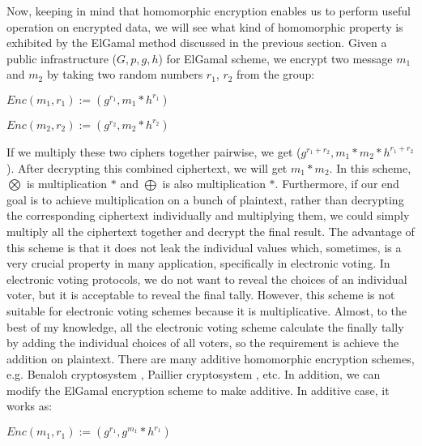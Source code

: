 	    
	    
	    
	     
	    Now, keeping in mind that homomorphic encryption enables us to perform useful operation on encrypted data, 
	    we will see what kind of homomorphic property is exhibited by the ElGamal method discussed in the previous section. 
	    Given a public infrastructure ($G, p, g, h$) for ElGamal scheme, 
	     we encrypt two message $m_{1}$ and $m_{2}$ by taking two random numbers $r_{1}$,  $r_{2}$ from the group:
	     \begin{displayquote}
	     $Enc(m_{1}, r_{1}) := (g^{r_{1}}, m_{1} *  h^{r_{1}})$ 
	      \end{displayquote}
	     
	     \begin{displayquote}
	     $Enc(m_{2}, r_{2}) := (g^{r_{2}}, m_{2} *  h^{r_{2}})$ 
	      \end{displayquote}
	     
	     
	     If we multiply these two ciphers together pairwise, we get ($g^{r_{1}+ r_{2}}, m_{1} * m_{2} *  h^{r_{1} + r_{2}}$). 
	     After decrypting this combined ciphertext, we will get $m_{1} * m_{2}$. In this scheme, $\bigotimes$ is multiplication $*$ and 
	     $\bigoplus$ is also multiplication $*$.  Furthermore,  
	     if our end goal is  to achieve multiplication on a bunch of plaintext,  rather than decrypting the corresponding ciphertext individually 
	     and multiplying them, we could simply multiply all the ciphertext together and decrypt the final result.  
	     The advantage of this scheme is that it does not leak the individual values which, sometimes, is a very crucial property in many 
	     application, specifically in electronic voting.
	     In electronic voting protocols, we do not want to reveal the choices of an individual voter, but it is acceptable to reveal the final tally. 
	     However, this scheme is not suitable for electronic voting schemes because it is multiplicative. Almost, to the best of 
	     my knowledge, all the electronic voting scheme calculate the finally tally by adding the individual choices of all
	     voters, so the requirement is achieve the addition on plaintext. 
	     There are 
	     many additive homomorphic encryption schemes, e.g. Benaloh cryptosystem \citep{benaloh1994dense}, Paillier cryptosystem \citep{paillier1999public},  etc. In addition, we 
	     can modify the ElGamal encryption scheme to make additive. In additive case, it works as:
	       \begin{displayquote}
	      $Enc(m_{1}, r_{1}) := (g^{r_{1}}, g^{m_{1}} *  h^{r_{1}})$ 
	      \end{displayquote}
	     
